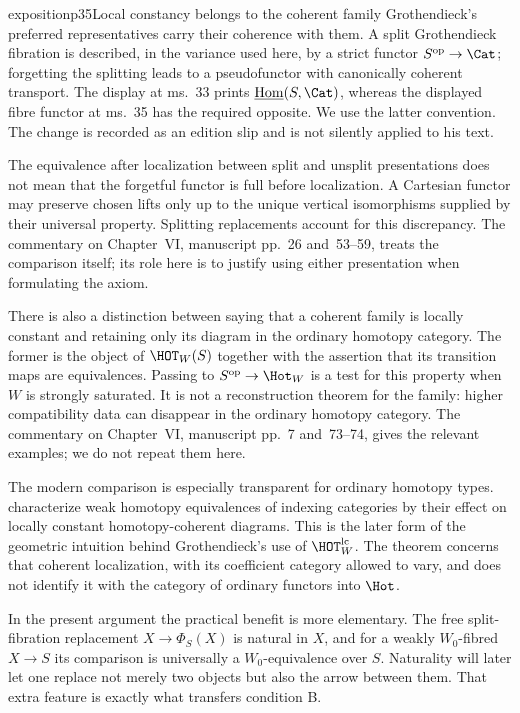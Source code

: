 \begin{dcomment}{exposition}{p35}{Local constancy belongs to the coherent family}
Grothendieck's preferred representatives carry their coherence with them. A split Grothendieck fibration is described, in the variance used here, by a strict functor $S^{\mathrm{op}}\to\Cat$; forgetting the splitting leads to a pseudofunctor with canonically coherent transport. The display at ms.~33 prints $\underline{\mathrm{Hom}}(S,\Cat)$, whereas the displayed fibre functor at ms.~35 has the required opposite. We use the latter convention. The change is recorded as an edition slip and is not silently applied to his text.

The equivalence after localization between split and unsplit presentations does not mean that the forgetful functor is full before localization. A Cartesian functor may preserve chosen lifts only up to the unique vertical isomorphisms supplied by their universal property. Splitting replacements account for this discrepancy. The commentary on Chapter~VI, manuscript pp.~26 and~53--59, treats the comparison itself; its role here is to justify using either presentation when formulating the axiom.

There is also a distinction between saying that a coherent family is locally constant and retaining only its diagram in the ordinary homotopy category. The former is the object of $\HOT_W(S)$ together with the assertion that its transition maps are equivalences. Passing to $S^{\mathrm{op}}\to\Hot_W$ is a test for this property when $W$ is strongly saturated. It is not a reconstruction theorem for the family: higher compatibility data can disappear in the ordinary homotopy category. The commentary on Chapter~VI, manuscript pp.~7 and~73--74, gives the relevant examples; we do not repeat them here.

The modern comparison is especially transparent for ordinary homotopy types. \citet[Definitions~1.1--1.2, Theorem~1.3, and Corollary~1.28]{Cisinski2009LocallyConstant} characterize weak homotopy equivalences of indexing categories by their effect on locally constant homotopy-coherent diagrams. This is the later form of the geometric intuition behind Grothendieck's use of $\HOT_W^{\mathrm{lc}}$. The theorem concerns that coherent localization, with its coefficient category allowed to vary, and does not identify it with the category of ordinary functors into $\Hot$.

In the present argument the practical benefit is more elementary. The free split-fibration replacement $X\to\Phi_S(X)$ is natural in $X$, and for a weakly $W_0$-fibred $X\to S$ its comparison is universally a $W_0$-equivalence over $S$. Naturality will later let one replace not merely two objects but also the arrow between them. That extra feature is exactly what transfers condition B.
\end{dcomment}

